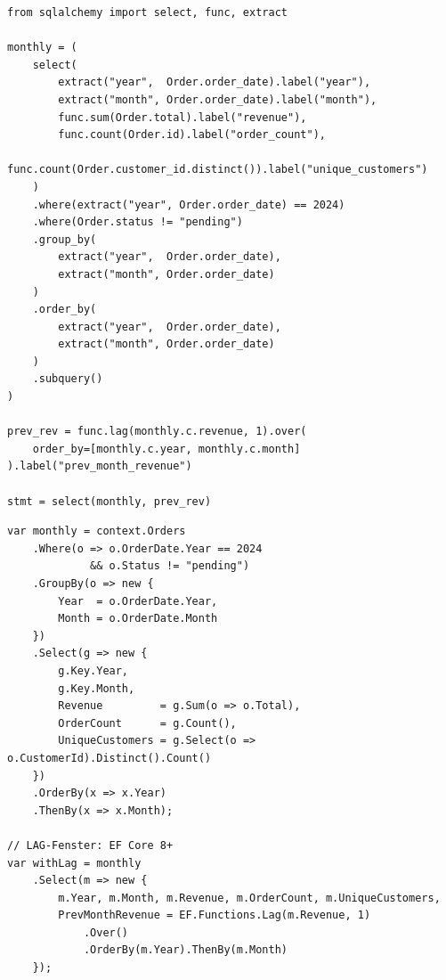 \begin{lstlisting}[style=pythonstyle, caption={Beispiel 10 -- Python (Business Report)},
  label=lst:bsp10_py]
from sqlalchemy import select, func, extract

monthly = (
    select(
        extract("year",  Order.order_date).label("year"),
        extract("month", Order.order_date).label("month"),
        func.sum(Order.total).label("revenue"),
        func.count(Order.id).label("order_count"),
        func.count(Order.customer_id.distinct()).label("unique_customers")
    )
    .where(extract("year", Order.order_date) == 2024)
    .where(Order.status != "pending")
    .group_by(
        extract("year",  Order.order_date),
        extract("month", Order.order_date)
    )
    .order_by(
        extract("year",  Order.order_date),
        extract("month", Order.order_date)
    )
    .subquery()
)

prev_rev = func.lag(monthly.c.revenue, 1).over(
    order_by=[monthly.c.year, monthly.c.month]
).label("prev_month_revenue")

stmt = select(monthly, prev_rev)
\end{lstlisting}

\begin{lstlisting}[style=csharpstyle, caption={Beispiel 10 -- C\# (Business Report)},
  label=lst:bsp10_cs]
var monthly = context.Orders
    .Where(o => o.OrderDate.Year == 2024
             && o.Status != "pending")
    .GroupBy(o => new {
        Year  = o.OrderDate.Year,
        Month = o.OrderDate.Month
    })
    .Select(g => new {
        g.Key.Year,
        g.Key.Month,
        Revenue         = g.Sum(o => o.Total),
        OrderCount      = g.Count(),
        UniqueCustomers = g.Select(o => o.CustomerId).Distinct().Count()
    })
    .OrderBy(x => x.Year)
    .ThenBy(x => x.Month);

// LAG-Fenster: EF Core 8+
var withLag = monthly
    .Select(m => new {
        m.Year, m.Month, m.Revenue, m.OrderCount, m.UniqueCustomers,
        PrevMonthRevenue = EF.Functions.Lag(m.Revenue, 1)
            .Over()
            .OrderBy(m.Year).ThenBy(m.Month)
    });
\end{lstlisting}

